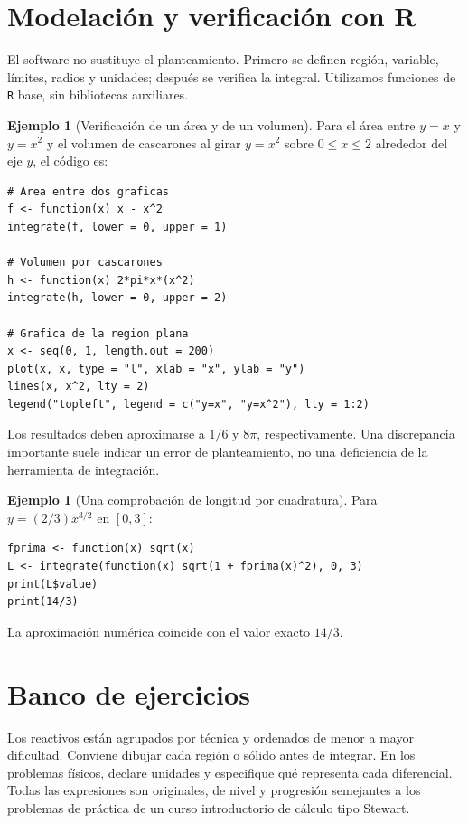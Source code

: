 \documentclass[12pt]{article}
\theoremstyle{definition}
\newtheorem{ejemplo}[teorema]{Ejemplo}
\theoremstyle{remark}
\begin{document}
\section{Modelación y verificación con R}
El software no sustituye el planteamiento. Primero se definen región, variable, límites, radios y unidades; después se verifica la integral. Utilizamos funciones de \texttt{R} base, sin bibliotecas auxiliares.
\begin{ejemplo}[Verificación de un área y de un volumen]
Para el área entre $y=x$ y $y=x^2$ y el volumen de cascarones al girar $y=x^2$ sobre $0\le x\le2$ alrededor del eje $y$, el código es:
\par\medskip
\begin{verbatim}
# Area entre dos graficas
f <- function(x) x - x^2
integrate(f, lower = 0, upper = 1)

# Volumen por cascarones
h <- function(x) 2*pi*x*(x^2)
integrate(h, lower = 0, upper = 2)

# Grafica de la region plana
x <- seq(0, 1, length.out = 200)
plot(x, x, type = "l", xlab = "x", ylab = "y")
lines(x, x^2, lty = 2)
legend("topleft", legend = c("y=x", "y=x^2"), lty = 1:2)
\end{verbatim}
Los resultados deben aproximarse a $1/6$ y $8\pi$, respectivamente. Una discrepancia importante suele indicar un error de planteamiento, no una deficiencia de la herramienta de integración.
\end{ejemplo}
\begin{ejemplo}[Una comprobación de longitud por cuadratura]
Para $y=(2/3)x^{3/2}$ en $[0,3]$:
\par\medskip
\begin{verbatim}
fprima <- function(x) sqrt(x)
L <- integrate(function(x) sqrt(1 + fprima(x)^2), 0, 3)
print(L$value)
print(14/3)
\end{verbatim}
La aproximación numérica coincide con el valor exacto $14/3$.
\end{ejemplo}

\section{Banco de ejercicios}
Los reactivos están agrupados por técnica y ordenados de menor a mayor dificultad. Conviene dibujar cada región o sólido antes de integrar. En los problemas físicos, declare unidades y especifique qué representa cada diferencial. Todas las expresiones son originales, de nivel y progresión semejantes a los problemas de práctica de un curso introductorio de cálculo tipo Stewart.
\end{document}
